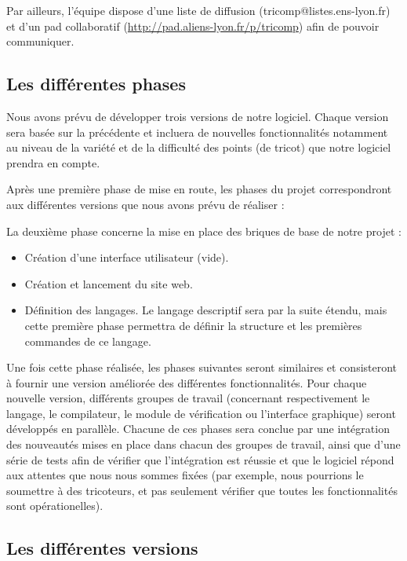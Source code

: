 \documentclass{article}
\begin{document}
Par ailleurs, l'équipe dispose d'une liste de diffusion (tricomp@listes.ens-lyon.fr) et d'un pad collaboratif (\url{http://pad.aliens-lyon.fr/p/tricomp}) afin de pouvoir communiquer.

\subsection{Les différentes phases}

Nous avons prévu de développer trois versions de notre logiciel. Chaque version sera basée sur la précédente et incluera de nouvelles
fonctionnalités notamment au niveau de la variété et de la difficulté des points (de tricot) que notre logiciel prendra en compte. \newline

Après une première phase de mise en route, les phases du projet correspondront aux différentes versions que nous avons prévu de réaliser :

La deuxième phase concerne la mise en place des briques de base de notre projet :
    \begin{itemize}
     \item Création d'une interface utilisateur (vide).
     \item Création et lancement du site web.
     \item Définition des langages. Le langage descriptif sera par la suite étendu, mais cette première phase permettra de définir la
structure et les premières commandes de ce langage.
    \end{itemize}

Une fois cette phase réalisée, les phases suivantes seront similaires et consisteront à fournir une version améliorée des
différentes fonctionnalités. Pour chaque nouvelle version, différents groupes de travail (concernant respectivement le langage, le
compilateur, le module de vérification ou l'interface graphique) seront développés en parallèle. Chacune de ces phases sera conclue
par une intégration des nouveautés mises en place dans chacun des groupes de travail, ainsi que d'une série de tests afin de vérifier que
l'intégration est réussie et que le logiciel répond aux attentes que nous nous sommes fixées (par exemple, nous pourrions le soumettre
à des tricoteurs, et pas seulement vérifier que toutes les fonctionnalités sont opérationelles).


\subsection{Les différentes versions}
\end{document}
